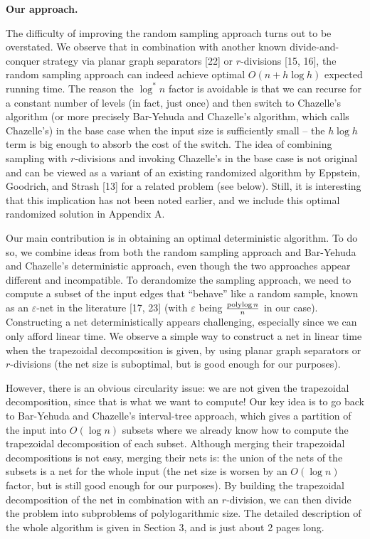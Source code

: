 \documentclass[10pt,a4paper]{article}
\begin{document}
\par\medskip\noindent\textbf{Our approach.}\par
The difficulty of improving the random sampling approach turns out to be overstated. We observe that in combination with another known divide-and-conquer strategy via planar graph separators [22] or $r$-divisions [15, 16], the random sampling approach can indeed achieve optimal $O(n+h\log h)$ expected running time. The reason the $\log^{*}n$ factor is avoidable is that we can recurse for a constant number of levels (in fact, just once) and then switch to Chazelle’s algorithm (or more precisely Bar-Yehuda and Chazelle’s algorithm, which calls Chazelle’s) in the base case when the input size is sufficiently small – the $h\log h$ term is big enough to absorb the cost of the switch. The idea of combining sampling with $r$-divisions and invoking Chazelle’s in the base case is not original and can be viewed as a variant of an existing randomized algorithm by Eppstein, Goodrich, and Strash [13] for a related problem (see below). Still, it is interesting that this implication has not been noted earlier, and we include this optimal randomized solution in Appendix A.
\par
\par
Our main contribution is in obtaining an optimal deterministic algorithm. To do so, we combine ideas from both the random sampling approach and Bar-Yehuda and Chazelle’s deterministic approach, even though the two approaches appear different and incompatible. To derandomize the sampling approach, we need to compute a subset of the input edges that “behave” like a random sample, known as an $\varepsilon$-net in the literature [17, 23] (with $\varepsilon$ being $\frac{\mathop{\rm polylog}n}{n}$ in our case). Constructing a net deterministically appears challenging, especially since we can only afford linear time. We observe a simple way to construct a net in linear time when the trapezoidal decomposition is given, by using planar graph separators or $r$-divisions (the net size is suboptimal, but is good enough for our purposes).
\par
\par
However, there is an obvious circularity issue: we are not given the trapezoidal decomposition, since that is what we want to compute! Our key idea is to go back to Bar-Yehuda and Chazelle’s interval-tree approach, which gives a partition of the input into $O(\log n)$ subsets where we already know how to compute the trapezoidal decomposition of each subset. Although merging their trapezoidal decompositions is not easy, merging their nets is: the union of the nets of the subsets is a net for the whole input (the net size is worsen by an $O(\log n)$ factor, but is still good enough for our purposes). By building the trapezoidal decomposition of the net in combination with an $r$-division, we can then divide the problem into subproblems of polylogarithmic size. The detailed description of the whole algorithm is given in Section 3, and is just about 2 pages long.
\end{document}
